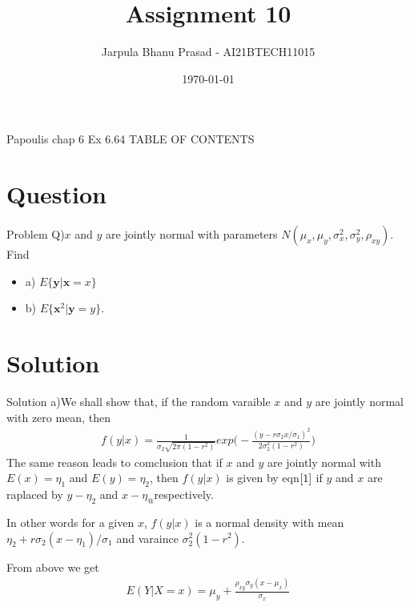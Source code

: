 \documentclass{beamer}
\title{Assignment 10}
\author{Jarpula Bhanu Prasad - AI21BTECH11015}
\date{\today}
\begin{document}
\begin{frame}
    \titlepage 
\end{frame}

\logo{}


\begin{frame}{Papoulis chap 6 Ex 6.64}
TABLE OF CONTENTS
    \tableofcontents
\end{frame}


\section{Question}
\begin{frame}{Problem}
Q)$x$ and $y$ are jointly normal with parameters $N(\mu_x,\mu_y,\sigma_x^{2},\sigma_y^{2},\rho_{xy})$.
Find 
\begin{itemize}
    \item a) $E\{\textbf{y}|\textbf{x}=x\}$
    \item b) $E\{\textbf{x}^2|\textbf{y}=y\}$.
\end{itemize} 
\end{frame}

\section{Solution}
\begin{frame}{Solution}
   a)We shall show that, if the random varaible $x$ and $y$ are jointly normal with zero mean, then 
   \begin{align} \label{1}
       f(y|x)= \frac{1}{\sigma_2 \sqrt{2\pi(1-r^2)}}exp\Bigg(-\frac{(y-r\sigma_2x/\sigma_1)^2}{2\sigma_2^2(1-r^2)}\Bigg)
   \end{align}
   The same reason leads to comclusion that if $x$ and $y$ are jointly normal with $E(x) = \eta_1$ and $E(y) = \eta_2$, then $f(y|x)$ is given by eqn$\eqref{1}$ if $y$ and $x$ are raplaced by $y-\eta_2$ and $x-\eta_@$respectively.
\end{frame}

\begin{frame}
   
   In other words for a given $x$, $f(y|x)$ is a normal density with mean $\eta_2 + r \sigma_2(x-\eta_1)/\sigma_1$ and varaince $\sigma_2^2(1-r^2)$.

   From above we get
   \begin{align}
       E(Y|X= x)= \mu_y + \frac{\rho_{xy}\sigma_y(x-\mu_x)}{\sigma_x}
   \end{align}

\end{frame}
\end{document}
